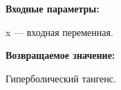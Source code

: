 \textbf{Входные параметры:}

 x --- входная переменная.

\textbf{Возвращаемое значение:}

Гиперболический тангенс.